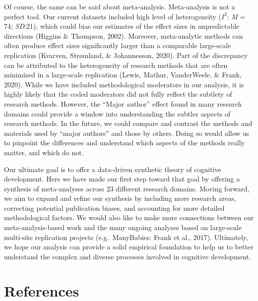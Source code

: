 \documentclass[10pt, letterpaper]{article}
\begin{document}
Of course, the same can be said about meta-analysis. Meta-analysis is
not a perfect tool. Our current datasets included high level of
heterogeneity (\(I^2\): \emph{M} = 74; \emph{SD}:21), which could bias
our estimates of the effect sizes in unpredictable directions (Higgins
\& Thompson, 2002). Moreover, meta-analytic methods can often produce
effect sizes significantly larger than a comparable large-scale
replication (Kvarven, Strømland, \& Johannesson, 2020). Part of the
discrepancy can be attributed to the heterogeneity of research methods
that are often minimized in a large-scale replication (Lewis, Mathur,
VanderWeele, \& Frank, 2020). While we have included methodological
moderators in our analysis, it is highly likely that the coded
moderators did not fully reflect the subtlety of research methods.
However, the ``Major author'' effect found in many research domains
could provide a window into understanding the subtler aspects of
research methods. In the future, we could compare and contrast the
methods and materials used by ``major authors'' and those by others.
Doing so would allow us to pinpoint the differences and understand which
aspects of the methods really matter, and which do not.

Our ultimate goal is to offer a data-driven synthetic theory of
cognitive development. Here we have made our first step toward that goal
by offering a synthesis of meta-analyses across 23 different research
domains. Moving forward, we aim to expand and refine our synthesis by
including more research areas, correcting potential publication biases,
and accounting for more detailed methodological factors. We would also
like to make more connections between our meta-analysis-based work and
the many ongoing analyses based on large-scale multi-site replication
projects (e.g.~ManyBabies: Frank et al., 2017). Ultimately, we hope our
analysis can provide a solid empirical foundation to help us to better
understand the complex and diverse processes involved in cognitive
development.

\hypertarget{references}{%
\section{References}\label{references}}

\setlength{\parindent}{-0.1in} 
\setlength{\leftskip}{0.125in}

\noindent
\end{document}
